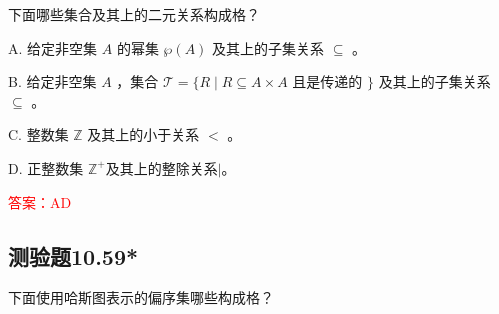 \documentclass[UTF8, heading=true]{ctexart}
\begin{document}
下面哪些集合及其上的二元关系构成格？

A. 给定非空集 $A$ 的幂集 $\wp(A)$ 及其上的子集关系 $\subseteq$ 。

B. 给定非空集 $A$ ，集合 $\mathcal{T}=\{R \mid R \subseteq A \times A$ 且是传递的 $\}$ 及其上的子集关系 $\subseteq$ 。

C. 整数集 $\mathbb{Z}$ 及其上的小于关系 $<$ 。

D. 正整数集 $\mathbb{Z}^{+}$及其上的整除关系$\mid$。

\textcolor{red}{答案：AD}

\subsection{测验题10.59*}

下面使用哈斯图表示的偏序集哪些构成格？
\end{document}
